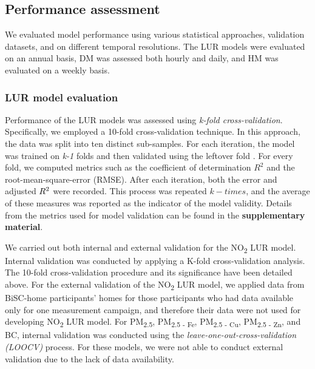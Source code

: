 \documentclass{article}
\begin{document}
\subsection{Performance assessment}
We evaluated model performance using various statistical approaches, validation datasets, and on different temporal resolutions. The LUR models were evaluated on an annual basis, DM was assessed both hourly and daily, and HM was evaluated on a weekly basis.

\subsubsection{LUR model evaluation}
Performance of the LUR models was assessed using \textit{k-fold cross-validation}. Specifically, we employed a 10-fold cross-validation technique. In this approach, the data was split into ten distinct sub-samples. For each iteration, the model was trained on \textit{k-1} folds and then validated using the leftover fold \cite{ziegel2003}. For every fold, we computed metrics such as the coefficient of determination \(R^2\) and the root-mean-square-error (RMSE). After each iteration, both the error and adjusted \(R\textsuperscript{2}\) were recorded. This process was repeated \(k-times\), and the average of these measures was reported as the indicator of the model validity. Details from the metrics used for model validation can be found in the \textbf{supplementary material}.

We carried out both internal and external validation for the NO\textsubscript{2} LUR model. Internal validation was conducted by applying a K-fold cross-validation analysis. The 10-fold cross-validation procedure and its significance have been detailed above. For the external validation of the NO\textsubscript{2} LUR model, we applied data from BiSC-home participants' homes for those participants who had data available only for one measurement campaign, and therefore their data were not used for developing NO\textsubscript{2} LUR model. For PM\textsubscript{2.5}, PM\textsubscript{2.5 - Fe}, PM\textsubscript{2.5 - Cu}, PM\textsubscript{2.5 - Zn}, and BC, internal validation was conducted using the \textit{leave-one-out-cross-validation (LOOCV)} process. For these models, we were not able to conduct external validation due to the lack of data availability.
\end{document}
